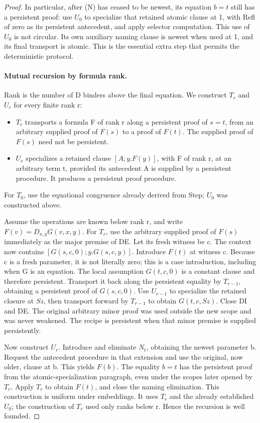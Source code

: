 \begin{proof}
In particular, after (N) has ceased to be newest, its equation \(b=t\)
still has a persistent proof: use \(U_0\) to specialize that retained
atomic clause at 1, with Refl of zero as its persistent antecedent, and
apply selector computation.  This use of \(U_0\) is not circular.
Its own auxiliary naming clause is newest when used at 1, and its final
transport is atomic.  This is the essential extra step that permits the
deterministic protocol.

\paragraph{Mutual recursion by formula rank.}
Rank is the number of D binders above the final equation.  We construct
\(T_r\) and \(U_r\) for every finite rank r:
\begin{itemize}
\item \(T_r\) transports a formula F of rank r along a persistent proof
of \(s=t\), from an arbitrary supplied proof of \(F(s)\) to a proof of
\(F(t)\).  The supplied proof of \(F(s)\) need not be persistent.
\item \(U_r\) specializes a retained clause \([A;y.F(y)]\), with F of
rank r, at an arbitrary term t, provided its antecedent A is supplied by
a persistent procedure.  It produces a persistent proof procedure.
\end{itemize}
For \(T_0\), use the equational congruence already derived from Step;
\(U_0\) was constructed above.

Assume the operations are known below rank r, and write
\(F(v)=D_{x,y}G(v,x,y)\).  For \(T_r\), use the arbitrary supplied
proof of \(F(s)\) immediately as the major premise of DE.  Let its fresh
witness be c.  The context now contains
\([G(s,c,0);y.G(s,c,y)]\).  Introduce \(F(t)\) at witness c.
Because c is a fresh parameter, it is not literally zero; this is a case
introduction, including when G is an equation.  The local assumption
\(G(t,c,0)\) is a constant clause and therefore persistent.  Transport
it back along the persistent equality by \(T_{r-1}\), obtaining a
persistent proof of \(G(s,c,0)\).  Use \(U_{r-1}\) to specialize the
retained closure at \(Sz\), then transport forward by \(T_{r-1}\) to
obtain \(G(t,c,Sz)\).  Close DI and DE.  The original arbitrary minor
proof was used outside the new scope and was never weakened.  The recipe
is persistent when that minor premise is supplied persistently.

Now construct \(U_r\).  Introduce and eliminate \(N_t\), obtaining
the newest parameter b.  Request the antecedent procedure in that
extension and use the original, now older, clause at b.  This yields
\(F(b)\).  The equality \(b=t\) has the persistent proof from the
atomic-specialization paragraph, even under the scopes later opened by
\(T_r\).  Apply \(T_r\) to obtain \(F(t)\), and close the naming
elimination.  This construction is uniform under embeddings.  It uses
\(T_r\) and the already established \(U_0\); the construction of
\(T_r\) used only ranks below r.  Hence the recursion is well founded.


\end{proof}
